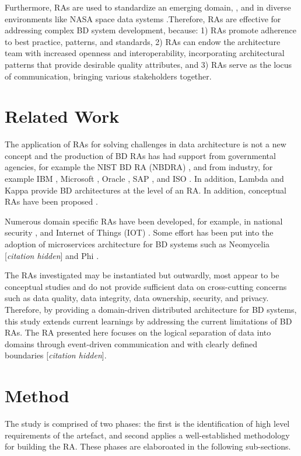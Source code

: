 \documentclass[a4paper,11pt]{article}
\let\cite\citep
\newcommand{\hc}{[\textit{citation hidden}]\textnormal{}}
\begin{document}
Furthermore, RAs are used to standardize an emerging domain, \citet{Iso18384-1}, and in diverse environments like NASA space data systems \cite{NASA}.Therefore, RAs are effective for addressing complex BD system development, because: 1) RAs promote adherence to best practice, patterns, and standards, 2) RAs can endow the architecture team with increased openness and interoperability, incorporating architectural patterns that provide desirable quality attributes, and 3) RAs serve as the locus of communication, bringing various stakeholders together. 

\section{Related Work}

The application of RAs for solving challenges in data architecture is not a new concept and the production of BD RAs has had support from governmental agencies, for example the NIST BD RA (NBDRA) \cite{Chang}, and from industry, for example IBM \cite{quintero2019ibm}, Microsoft \cite{levin2013big}, Oracle \cite{cackett2013information}, SAP \cite{SAPRA}, and ISO \cite{ISO20547}. In addition, Lambda \cite{kiran2015lambda} and Kappa \cite{lin2017lambda} provide BD architectures at the level of an RA. In addition, conceptual RAs have been proposed \cite{Maier,suthakar2017scalable,framework2015draft}.

Numerous domain specific RAs have been developed, for example, in national security \cite{Klein}, and Internet of Things (IOT)  \cite{weyrich2015reference}. Some effort has been put into the adoption of microservices architecture for BD systems such as Neomycelia 
\hc{}\hspace{1mm}
 and Phi \cite{maamouri2021phi}. 
 
The RAs investigated may be instantiated but outwardly, most appear to be conceptual studies and do not provide sufficient data on cross-cutting concerns such as data quality, data integrity, data ownership, security, and privacy. Therefore, by providing a domain-driven distributed architecture for BD systems, this study extends current learnings by addressing the current limitations of BD RAs. 
The RA presented here focuses on the logical separation of data into domains through event-driven communication and with clearly defined boundaries %
\hc{}. 

\section{Method}
The study is comprised of two phases: the first is the identification of high level requirements of the artefact, and second applies a well-established methodology for building the RA. These phases are elaboroated in the following sub-sections.
\end{document}

